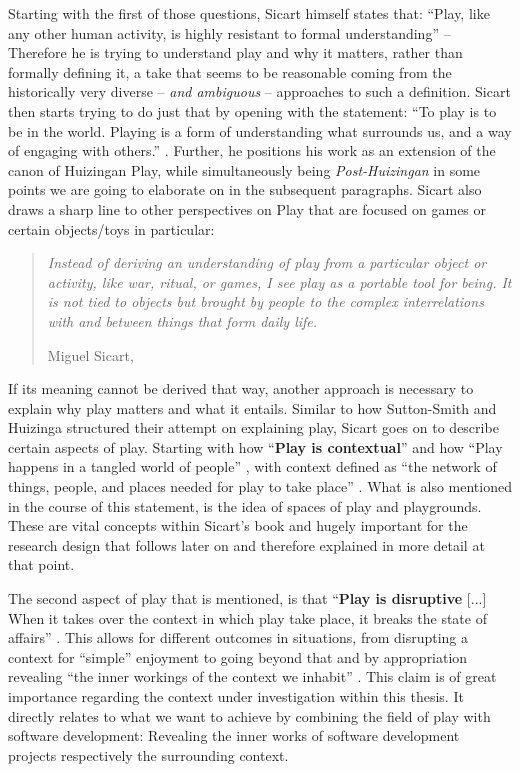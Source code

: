 Starting with the first of those questions, Sicart himself states that: \enquote{Play, like any other human activity, is highly resistant to formal understanding} \cite[p. 2]{sicart2014play} -- Therefore he is trying to understand play and why it matters, rather than formally defining it, a take that seems to be reasonable coming from the historically very diverse -- \textit{and ambiguous} -- approaches to such a definition. Sicart then starts trying to do just that by opening with the statement: \enquote{To play is to be in the world. Playing is a form of understanding what surrounds us, and a way of engaging with others.} \cite[p. 1]{sicart2014play}. Further, he positions his work as an extension of the canon of Huizingan Play, while simultaneously being \textit{Post-Huizingan} in some points we are going to elaborate on in the subsequent paragraphs. Sicart also draws a sharp line to other perspectives on Play that are focused on games or certain objects/toys in particular:

\begin{quote}
  \textit{Instead of deriving an understanding of play from a particular object or activity, like war, ritual, or games, I see play as a portable tool for being. It is not tied to objects but brought by people to the complex interrelations with and between things that form daily life.}

  \footnotesize{Miguel Sicart, \cite[p. 2]{sicart2014play}}
\end{quote}

If its meaning cannot be derived that way, another approach is necessary to explain why play matters and what it entails. Similar to how Sutton-Smith and Huizinga structured their attempt on explaining play, Sicart goes on to describe certain aspects of play. Starting with how \enquote{\textbf{Play is contextual}} \cite[p. 6]{sicart2014play} and how \enquote{Play happens in a tangled world of people} \cite[p. 6]{sicart2014play}, with context defined as \enquote{the network of things, people, and places needed for play to take place} \cite[p. 7]{sicart2014play}. What is also mentioned in the course of this statement, is the idea of spaces of play and playgrounds. These are vital concepts within Sicart's book and hugely important for the research design that follows later on and therefore explained in more detail at that point.

The second aspect of play that is mentioned, is that \enquote{\textbf{Play is disruptive} [...] When it takes over the context in which play take place, it breaks the state of affairs} \cite[p. 14]{sicart2014play}. This allows for different outcomes in situations, from disrupting a context for \enquote{simple} enjoyment to going beyond that and by appropriation revealing \enquote{the inner workings of the context we inhabit} \cite[p. 15]{sicart2014play}. This claim is of great importance regarding the context under investigation within this thesis. It directly relates to what we want to achieve by combining the field of play with software development: Revealing the inner works of software development projects respectively the surrounding context.

